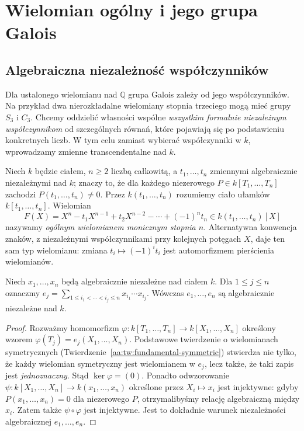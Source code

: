 \chapter{Wielomian ogólny i jego grupa Galois}\label{aa:ch:generic-polynomial}
\section{Algebraiczna niezależność współczynników}
Dla ustalonego wielomianu nad $\mathbb Q$ grupa Galois zależy od
jego współczynników. Na przykład dwa nierozkładalne wielomiany stopnia
trzeciego mogą mieć grupy $S_3$ i $C_3$. Chcemy oddzielić własności
wspólne \emph{wszystkim formalnie niezależnym współczynnikom} od
szczególnych równań, które pojawiają się po podstawieniu konkretnych
liczb. W tym celu zamiast wybierać współczynniki w $k$, wprowadzamy
zmienne transcendentalne nad $k$.

\begin{definicja}\label{aa:def:generic-poly}
Niech $k$ będzie ciałem, $n\ge2$ liczbą całkowitą, a
$t_1,\ldots,t_n$ zmiennymi algebraicznie niezależnymi nad $k$;
znaczy to, że dla każdego niezerowego
$P\in k[T_1,\ldots,T_n]$ zachodzi $P(t_1,\ldots,t_n)\ne0$.
Przez $k(t_1,\ldots,t_n)$ rozumiemy ciało ułamków
$k[t_1,\ldots,t_n]$. Wielomian
\[
 F(X)=X^n-t_1X^{n-1}+t_2X^{n-2}-\cdots+(-1)^nt_n
 \in k(t_1,\ldots,t_n)[X]
\]
nazywamy \emph{ogólnym wielomianem monicznym stopnia $n$}.
Alternatywna konwencja znaków, z niezależnymi współczynnikami
przy kolejnych potęgach $X$, daje ten sam typ wielomianu: zmiana
$t_i\mapsto(-1)^it_i$ jest automorfizmem pierścienia wielomianów.
\end{definicja}

\begin{lemat}
\label{aa:lem:generic-independence}
Niech $x_1,\ldots,x_n$ będą algebraicznie niezależne nad ciałem $k$.
Dla $1\le j\le n$ oznaczmy
$e_j=\sum_{1\le i_1<\cdots<i_j\le n}x_{i_1}\cdots x_{i_j}$.
Wówczas $e_1,\ldots,e_n$ są algebraicznie niezależne nad $k$.
\end{lemat}
\begin{proof}
Rozważmy homomorfizm
$\varphi:k[T_1,\ldots,T_n]\to k[X_1,\ldots,X_n]$
określony wzorem $\varphi(T_j)=e_j(X_1,\ldots,X_n)$.
Podstawowe twierdzenie o wielomianach symetrycznych
(Twierdzenie~\ref{aa:tw:fundamental-symmetric}) stwierdza nie tylko,
że każdy wielomian symetryczny jest wielomianem w $e_j$, lecz także,
że taki zapis jest \emph{jednoznaczny}. Stąd $\ker\varphi=(0)$.
Ponadto odwzorowanie
$\psi:k[X_1,\ldots,X_n]\to k(x_1,\ldots,x_n)$
określone przez $X_i\mapsto x_i$ jest injektywne: gdyby
$P(x_1,\ldots,x_n)=0$ dla niezerowego $P$, otrzymalibyśmy relację
algebraiczną między $x_i$. Zatem także $\psi\circ\varphi$ jest
injektywne. Jest to dokładnie warunek niezależności algebraicznej
$e_1,\ldots,e_n$.
\end{proof}

